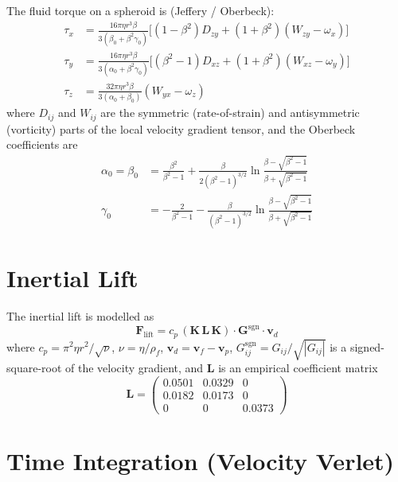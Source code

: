 \documentclass[12pt]{article}
\newcommand{\bs}[1]{\boldsymbol{#1}}
\begin{document}
The fluid torque on a spheroid is (Jeffery / Oberbeck):
\begin{align}
  \tau_x &= \frac{16\pi\eta r^3\beta}{3(\beta_0+\beta^2\gamma_0)}
            \bigl[(1-\beta^2)D_{zy} + (1+\beta^2)(W_{zy}-\omega_x)\bigr] \\
  \tau_y &= \frac{16\pi\eta r^3\beta}{3(\alpha_0+\beta^2\gamma_0)}
            \bigl[(\beta^2-1)D_{xz} + (1+\beta^2)(W_{xz}-\omega_y)\bigr] \\
  \tau_z &= \frac{32\pi\eta r^3\beta}{3(\alpha_0+\beta_0)}
            (W_{yx}-\omega_z)
\end{align}
where $D_{ij}$ and $W_{ij}$ are the symmetric (rate-of-strain) and antisymmetric
(vorticity) parts of the local velocity gradient tensor, and the Oberbeck
coefficients are
\begin{align}
  \alpha_0 = \beta_0 &= \frac{\beta^2}{\beta^2-1}
    + \frac{\beta}{2(\beta^2-1)^{3/2}}\ln\!\frac{\beta-\sqrt{\beta^2-1}}{\beta+\sqrt{\beta^2-1}} \\
  \gamma_0 &= -\frac{2}{\beta^2-1}
    - \frac{\beta}{(\beta^2-1)^{3/2}}\ln\!\frac{\beta-\sqrt{\beta^2-1}}{\beta+\sqrt{\beta^2-1}}
\end{align}

\section{Inertial Lift}

The inertial lift is modelled as
\begin{equation}
  \bs{F}_\text{lift} = c_p\, (\bs{K}\,\bs{L}\,\bs{K})
    \cdot \bs{G}^\text{sgn} \cdot \bs{v}_d
\end{equation}
where $c_p = \pi^2\eta r^2 / \sqrt{\nu}$, $\nu = \eta/\rho_f$,
$\bs{v}_d = \bs{v}_f - \bs{v}_p$, $G^\text{sgn}_{ij} = G_{ij}/\sqrt{|G_{ij}|}$
is a signed-square-root of the velocity gradient, and $\bs{L}$ is an empirical
coefficient matrix
\begin{equation}
  \bs{L} = \begin{pmatrix}
    0.0501 & 0.0329 & 0 \\
    0.0182 & 0.0173 & 0 \\
    0      & 0      & 0.0373
  \end{pmatrix}
\end{equation}

\section{Time Integration (Velocity Verlet)}
\end{document}
